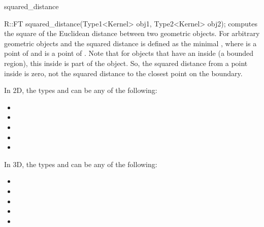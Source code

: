 \begin{ccRefFunction}{squared_distance}
\\

{R::FT squared_distance(Type1<Kernel> obj1, Type2<Kernel> obj2);}
{computes the square of the Euclidean distance between two geometric objects. 
For arbitrary geometric objects  and
 the squared distance is defined as the minimal
, where  is a point of
 and  is a point of .
Note that for objects that have an inside (a bounded region), this inside 
is part of the object. So, the squared distance from a point inside is 
zero, not the squared distance to the closest point on the boundary.}

In 2D, the types  and  can be any of the
following:
\begin{itemize}
\item {}
\item {}
\item {}
\item {}
\item {}
\end{itemize}

In 3D, the types  and  can be any of the
following:
\begin{itemize}
\item {}
\item {}
\item {}
\item {}
\item {}
\end{itemize}

\ccSeeAlso
{} \\
 \\
 \\
 \\
 \\
 \\
 \\
\\
 \\

\end{ccRefFunction}
